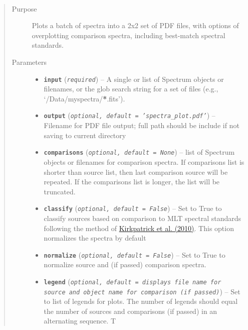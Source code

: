 \documentclass[letterpaper,10pt,english]{sphinxmanual}
\begin{document}

\begin{fulllineitems}
\label{api:splat_plot.plotBatch}~\begin{quote}\begin{description}
\item[{Purpose}] \leavevmode
Plots a batch of spectra into a 2x2 set of PDF files, with options of overplotting comparison spectra, including best-match spectral standards.

\item[{Parameters}] \leavevmode\begin{itemize}
\item {} 
\textbf{\texttt{input}} (\emph{\texttt{required}}) -- A single or list of Spectrum objects or filenames, or the glob search string for a set of files (e.g., `/Data/myspectra/{\color{red}\bfseries{}*}.fits').

\item {} 
\textbf{\texttt{output}} (\emph{\texttt{optional, default = 'spectra\_plot.pdf'}}) -- Filename for PDF file output; full path should be include if not saving to current directory

\item {} 
\textbf{\texttt{comparisons}} (\emph{\texttt{optional, default = None}}) -- list of Spectrum objects or filenames for comparison spectra. If comparisons list is shorter than source list, then last comparison source will be repeated. If the comparisons list is longer, the list will be truncated.

\item {} 
\textbf{\texttt{classify}} (\emph{\texttt{optional, default = False}}) -- 
Set to True to classify sources based on comparison to MLT spectral standards following the method of \href{http://adsabs.harvard.edu/abs/2010ApJS..190..100K}{Kirkpatrick et al. (2010)}. This option normalizes the spectra by default


\item {} 
\textbf{\texttt{normalize}} (\emph{\texttt{optional, default = False}}) -- Set to True to normalize source and (if passed) comparison spectra.

\item {} 
\textbf{\texttt{legend}} (\emph{\texttt{optional, default = displays file name for source and object name for comparison (if passed)}}) -- Set to list of legends for plots. The number of legends should equal the number of sources and comparisons (if passed) in an alternating sequence. T


\end{itemize}
\end{description}
\end{quote}
\end{fulllineitems}
\end{document}

